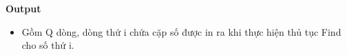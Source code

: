 \textbf{Output}
\begin{itemize}
	\item Gồm Q dòng, dòng thứ i chứa cặp số được in ra khi thực hiện thủ tục Find cho số thứ i.
\end{itemize}